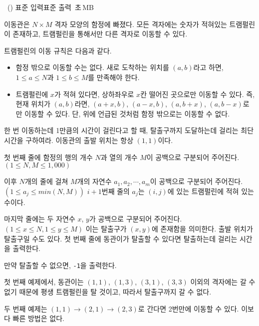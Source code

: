 \begin{problem}{\kcpcprobtrap\ (\kcpcprobtrapshort)}
    {표준 입력}{표준 출력}
    {\kcpcprobtraptime\,초}{\kcpcprobtrapmemory\,MB}{}
    
    이동관은 $ N \times M$ 격자 모양의 함정에 빠졌다. 모든 격자에는 숫자가 적혀있는 트램펄린이 존재하고, 트램펄린을 통해서만 다른 격자로 이동할 수 있다.
    
    트램펄린의 이동 규칙은 다음과 같다.
    
    \begin{itemize}
        \item 함정 밖으로 이동할 수는 없다. 새로 도착하는 위치를 $(a, b)$라고 하면, $1 \leq a \leq N$과 $1 \leq b \leq M$를 만족해야 한다.
        \item 트램펄린에 $ x $가 적혀 있다면, 상하좌우로 $ x $칸 떨어진 곳으로만 이동할 수 있다. 즉, 현재 위치가 $(a, b)$라면, $(a+x, b)$, $(a-x, b)$, $(a, b+x)$, $(a, b-x)$로만 이동할 수 있다. 단, 위에 언급된 것처럼 함정 밖으로는 이동할 수 없다.
    \end{itemize}
    
    한 번 이동하는데 1만큼의 시간이 걸린다고 할 때, 탈출구까지 도달하는데 걸리는 최단 시간을 구하여라. 이동관의 출발 위치는 항상 $(1, 1)$이다.
    
    \InputFile
    첫 번째 줄에 함정의 행의 개수 $ N $과 열의 개수 $ M $이 공백으로 구분되어 주어진다. $( 1 \leq N, M \leq 1,000 ) $
    
    이후 $N$개의 줄에 걸쳐 $M$개의 자연수 $a_{1}, a_{2}, \cdots, a_{m}$이 공백으로 구분되어 주어진다. $ (1 \leq a_{j} \leq min(N,M)) $ $i+1$번째 줄의 $a_{j}$는 $ (i, j) $에 있는 트램펄린에 적혀 있는 수이다.
    
    마지막 줄에는 두 자연수 $x$, $y$가 공백으로 구분되어 주어진다. $(1 \leq x \leq N, 1 \leq y \leq M) $ 이는 탈출구가 $ (x, y) $에 존재함을 의미한다. 출발 위치가 탈출구일 수도 있다.
    \OutputFile
    첫 번째 줄에 동관이가 탈출할 수 있다면 탈출하는데 걸리는 시간을 출력한다. 
    
    만약 탈출할 수 없으면, \texttt{-1}을 출력한다.
   
    \Examples
    
    \begin{example}
    \end{example}
    
    \Explanation
    첫 번째 예제에서, 동관이는 $ (1,1) $, $ (1,3) $, $ (3,1) $, $ (3,3) $ 이외의 격자에는 갈 수 없기 때문에 평생 트램펄린을 탈 것이고, 따라서 탈출구까지 갈 수 없다.
    
    두 번째 예제는 $ (1,1) \rightarrow (2,1) \rightarrow (2,3)$로 간다면 2번만에 이동할 수 있다. 이보다 빠른 방법은 없다.
    
    
\end{problem}

